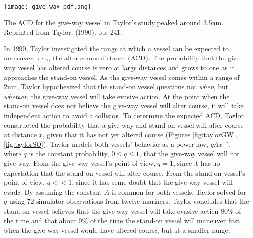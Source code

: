 \documentclass[twoside,symmetric,notoc]{tufte-book}
\newcommand{\hairsp}{\hspace{1pt}}
\newcommand{\ie}{\textit{i.\hairsp{}e.,}\hspace{3pt}}
\begin{document}
\begin{marginfigure}[0.8in]
\centering
	\texttt{[image: give\_way\_pdf.png]}
	\caption[The ACD for the give-way vessel in Taylor's study peaked around 3.5nm.]{The ACD for the give-way vessel in Taylor's study peaked around 3.5nm. Reprinted from Taylor. (1990). pp. 241.}
	\label{fig:taylorGW}
	\forcerectofloat
\end{marginfigure}
\par{%
In 1990, Taylor\cite{Taylor} investigated the range at which a vessel can be expected to maneuver, \ie, the alter-course distance (ACD). The probability that the give-way vessel has altered course is zero at large distances and grows to one as it approaches the stand-on vessel. As the give-way vessel comes within a range of 2nm, Taylor hypothesized that the stand-on vessel questions not \textit{when}, but \textit{whether}, the give-way vessel will take evasive action. At the point when the stand-on vessel does not believe the give-way vessel will alter course, it will take independent action to avoid a collision. To determine the expected ACD, Taylor constructed the probability that a give-way and stand-on vessel will alter course at distance $x$, given that it has not yet altered course (Figures \ref{fig:taylorGW}, \ref{fig:taylorSO}). Taylor models both vessels' behavior as a power law, $qAx^{-r}$, where $q$ is the constant probability, $0 \leq q \leq 1$, that the give-way vessel will not give-way. From the give-way vessel's point of view, $q=1$, since it has no expectation that the stand-on vessel will alter course. From the stand-on vessel's point of view, $q<<1$, since it has some doubt that the give-way vessel will evade. By assuming the constant $A$ is common for both vessels, Taylor solved for $q$ using 72 simulator observations from twelve mariners. Taylor concludes that the stand-on vessel believes that the give-way vessel will take evasive action 80\% of the time and that about 9\% of the time the stand-on vessel will maneuver first when the give-way vessel would have altered course, but at a smaller range.
}
\end{document}
